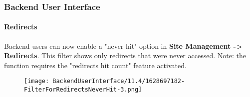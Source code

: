 %

\begin{frame}[fragile]
	\frametitle{Backend User Interface}
	\framesubtitle{Redirects}

	Backend users can now enable a "never hit" option in \textbf{Site Management -> Redirects}.
	This filter shows only redirects that were never accessed.\newline
	\small
		Note: the function requires the "redirects hit count" feature activated.
	\normalsize

	\begin{figure}
		\texttt{[image: BackendUserInterface/11.4/1628697182-FilterForRedirectsNeverHit-3.png]}
	\end{figure}

\end{frame}

